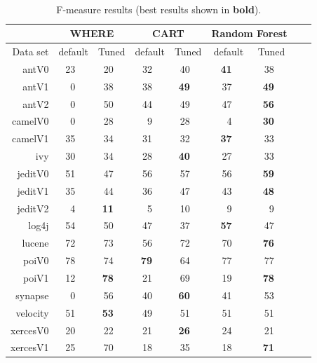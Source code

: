\documentclass{sig-alternative}
\begin{document}
\begin{table}[!t]
\renewcommand{\baselinestretch}{0.8} 

\scriptsize  
~~~\begin{tabular}{r|rl|rl|rl|rl|rl|rlrl}
      &   \multicolumn{4}{c|}{WHERE}         &   \multicolumn{4}{c|}{CART}         &   \multicolumn{4}{c}{Random Forest}         \\\hline
  Data set   &   \multicolumn{2}{c}{default}         &   \multicolumn{2}{c|}{Tuned}         &   \multicolumn{2}{c}{default}         &   \multicolumn{2}{c|}{Tuned}    &   \multicolumn{2}{c}{default}  &   \multicolumn{2}{c}{Tuned}\\\hline
antV0 & 23 &   & 20 &   & 32 &   & 40 &   & {\bf 41} &   & 38 &  \\
antV1 & 0 &   & 38 &   & 38 &   & {\bf 49} &   & 37 &   & {\bf 49} &  \\
antV2 & 0 &   & 50 &   & 44 &   &  49 &   & 47 &   & {\bf 56} &  \\
camelV0 & 0 &   & 28 &   & 9 &   & 28 &   & 4 &   & {\bf 30} &  \\
camelV1 & 35 &   & 34 &   & 31 &   & 32 &   & {\bf 37} &   & 33 &  \\
ivy & 30 &   & 34 &   & 28 &   & {\bf 40} &   & 27 &   &  33 &  \\
jeditV0 & 51 &   & 47 &   & 56 &   & 57 &   & 56 &   & {\bf 59} &  \\
jeditV1 & 35 &   & 44 &   & 36 &   & 47 &   & 43 &   & {\bf 48} &  \\
jeditV2 & 4 &   & {\bf 11} &   & 5 &   & 10 &   & 9 &   & 9 &  \\
log4j & 54 &   & 50 &   & 47 &   & 37 &   & {\bf 57} &   & 47 &  \\
lucene & 72 &   & 73 &   & 56 &   & 72 &   & 70 &   & {\bf 76} &  \\
poiV0 & 78 &   & 74 &   & {\bf 79} &   & 64 &   & 77 &   & 77 &  \\
poiV1 & 12 &   & {\bf 78} &   & 21 &   & 69 &   & 19 &   & {\bf 78} &  \\
synapse & 0 &   & 56 &   & 40 &   & {\bf 60} &   & 41 &   & 53 &  \\
velocity & 51 &   & {\bf 53} &   & 49 &   & 51 &   & 51 &   & 51 &  \\
xercesV0 & 20 &   & 22 &   & 21 &   & {\bf 26} &   & 24 &   & 21 &  \\
xercesV1 & 25 &   & 70 &   & 18 &   & 35 &   & 18 &   & {\bf 71} &  \\
\end{tabular}
\caption{F-measure results (best results  shown in {\bf bold}).}
\label{tab:fbars}
\end{table}
\end{document}
